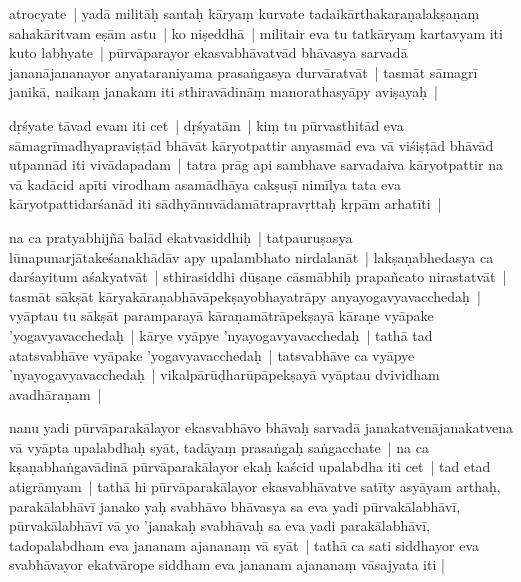 \documentclass[article,12pt,a4paper]{memoir}%
\newcounter{parCount}
\begin{document}
	  \pstart \leavevmode%
	\label{thakur75-75.10}atrocyate | yadā militāḥ santaḥ kāryaṃ kurvate tadaikārthakaraṇalakṣaṇaṃ sahakāritvam eṣām astu | ko niṣeddhā | militair eva tu tatkāryaṃ kartavyam iti kuto labhyate | pūrvāparayor ekasvabhāvatvād bhāvasya sarvadā jananājananayor anyataraniyama prasaṅgasya durvāratvāt | tasmāt sāmagrī janikā, naikaṃ janakam iti sthiravādināṃ manorathasyāpy aviṣayaḥ |
	{}
	\pend%
      

	  \pstart \leavevmode%
	\label{thakur75-75.15}dṛśyate tāvad evam iti cet | dṛśyatām | kiṃ tu pūrvasthitād eva sāmagrīmadhyapraviṣṭād bhāvāt kāryotpattir anyasmād eva vā viśiṣṭād bhāvād utpannād iti vivādapadam | tatra prāg api sambhave sarvadaiva kāryotpattir na vā kadācid apīti virodham asamādhāya cakṣuṣī nimīlya tata eva kāryotpattidarśanād iti sādhyānuvādamātrapravṛttaḥ kṛpām arhatīti |
	{}
	\pend%
      

	  \pstart \leavevmode%
	\label{thakur75-75.20}na ca pratyabhijñā balād ekatvasiddhiḥ | tatpauruṣasya lūnapunarjātakeśanakhādāv apy upalambhato nirdalanāt | lakṣaṇabhedasya ca darśayitum aśakyatvāt | sthirasiddhi dūṣaṇe cāsmābhiḥ prapañcato nirastatvāt |\label{thakur75-75.22} tasmāt sākṣāt kāryakāraṇabhāvāpekṣayobhayatrāpy anyayogavyavacchedaḥ | vyāptau tu sākṣāt paramparayā kāraṇamātrāpekṣayā kāraṇe vyāpake 'yogavyavacchedaḥ | kārye vyāpye 'nyayogavyavacchedaḥ | tathā tad atatsvabhāve vyāpake 'yogavyavacchedaḥ | tatsvabhāve ca vyāpye 'nyayogavyavacchedaḥ | vikalpārūḍharūpāpekṣayā vyāptau dvividham avadhāraṇam |
	{}
	\pend%
      

	  \pstart \leavevmode%
	\label{thakur75-75.27}nanu yadi pūrvāparakālayor ekasvabhāvo bhāvaḥ sarvadā janakatvenājanakatvena vā vyāpta upalabdhaḥ syāt, tadāyaṃ prasaṅgaḥ saṅgacchate | na ca kṣaṇabhaṅgavādinā pūrvāparakālayor ekaḥ kaścid upalabdha iti cet |\label{thakur75-76.1} tad etad atigrāmyam | tathā hi pūrvāparakālayor ekasvabhāvatve satīty asyāyam arthaḥ, parakālabhāvī janako yaḥ svabhāvo bhāvasya sa eva yadi pūrvakālabhāvī, pūrvakālabhāvī vā yo 'janakaḥ svabhāvaḥ sa eva yadi parakālabhāvī, tadopalabdham eva jananam ajananaṃ vā syāt | tathā ca sati siddhayor eva svabhāvayor ekatvārope siddham eva jananam ajananaṃ vāsajyata iti |
	{}
	\pend%
      
\end{document}

